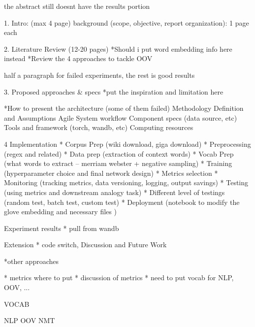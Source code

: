 the abstract still doesnt have the results portion


1. Intro: 
(max 4 page) background
(scope, objective, report organization): 1 page each 

2. Literature Review (12-20 pages)
*Should i put word embedding info here instead
*Review the 4 approaches to tackle OOV

half a paragraph for failed experiments, the rest is good results

3. Proposed approaches & specs
*put the inspiration and limitation here

*How to present the architecture (some of them failed) 
Methodology 
Definition and Assumptions
Agile
System workflow 
Component specs (data source, etc)
Tools and framework (torch, wandb, etc) 
Computing resources


4 Implementation
* Corpus Prep (wiki download, giga download)
* Preprocessing (regex and related) 
* Data prep (extraction of context words) 
* Vocab Prep (what words to extract -- merriam webster + negative sampling) 
* Training (hyperparameter choice and final network design)
* Metrics selection 
* Monitoring (tracking metrics, data versioning, logging, output savings)
* Testing (using metrics and downstream analogy task) 
* Different level of testings (random test, batch test, custom test)  
* Deployment (notebook to modify the glove embedding and necessary files )


Experiment results
* pull from wandb 


Extension
* code switch, 
Discussion and Future Work




*other approaches 

* metrics where to put 
* discussion of metrics 
* need to put vocab for NLP, OOV, ...

VOCAB

NLP
OOV
NMT